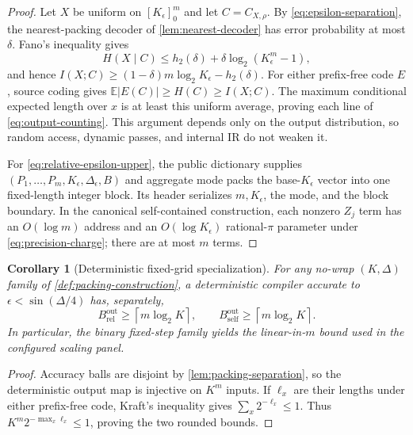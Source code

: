 \documentclass[a4paper,twocolumn,10pt,unpublished]{quantumarticle}
\newtheorem{corollary}{Corollary}
\begin{document}
\begin{proof}
Let $X$ be uniform on $[K_\epsilon]_0^m$ and let $C=C_{X,\rho}$.
By \eqref{eq:epsilon-separation}, the nearest-packing decoder of
\cref{lem:nearest-decoder} has error probability at most $\delta$.  Fano's
inequality gives
\begin{equation*}
 H(X\mid C)\leq h_2(\delta)
       +\delta\log_2(K_\epsilon^m-1),
\end{equation*}
and hence
$I(X;C)\geq(1-\delta)m\log_2K_\epsilon-h_2(\delta)$.
For either prefix-free code $E$, source coding gives
$\mathbb E|E(C)|\geq H(C)\geq I(X;C)$.  The maximum conditional expected
length over $x$ is at least this uniform average, proving each line of
\eqref{eq:output-counting}.  This argument depends only on the output
distribution, so random access, dynamic passes, and internal IR do not
weaken it.

For \eqref{eq:relative-epsilon-upper}, the public dictionary supplies
$(P_1,\ldots,P_m,K_\epsilon,\Delta_\epsilon,B)$ and aggregate mode packs
the base-$K_\epsilon$ vector into one fixed-length integer block.  Its
header serializes $m,K_\epsilon$, the mode, and the block boundary.  In the
canonical self-contained construction, each nonzero $Z_j$ term has an
$O(\log m)$ address and an $O(\log K_\epsilon)$ rational-$\pi$ parameter
under \eqref{eq:precision-charge}; there are at most $m$ terms.
\end{proof}

\begin{corollary}[Deterministic fixed-grid specialization]
\label{cor:fixed-grid-output}
For any no-wrap $(K,\Delta)$ family of
\cref{def:packing-construction}, a deterministic compiler accurate to
$\epsilon<\sin(\Delta/4)$ has, separately,
\begin{equation*}
 B_{\mathrm{rel}}^{\mathrm{out}}\geq\left\lceil m\log_2K\right\rceil,
 \qquad
 B_{\mathrm{self}}^{\mathrm{out}}\geq\left\lceil m\log_2K\right\rceil.
\end{equation*}
In particular, the binary fixed-step family yields the linear-in-$m$ bound used in the
configured scaling panel.
\end{corollary}

\begin{proof}
Accuracy balls are disjoint by \cref{lem:packing-separation}, so the
deterministic output map is injective on $K^m$ inputs.  If $\ell_x$ are
their lengths under either prefix-free code, Kraft's inequality gives
$\sum_x2^{-\ell_x}\leq1$.  Thus
$K^m2^{-\max_x\ell_x}\leq1$, proving the two rounded bounds.
\end{proof}
\end{document}
